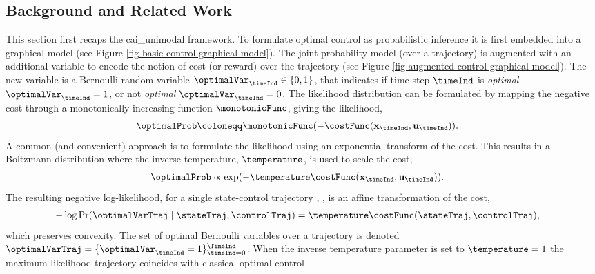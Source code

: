 \documentclass{mimosis-class/mimosis}
\numberwithin{equation}{chapter}
\newcommand{\state}{\ensuremath{\mathbf{x}}}
\newcommand{\control}{\ensuremath{\mathbf{u}}}
\begin{document}
{\subsection{Background and Related Work \label{sec-inference-background}}
\label{sec:org7e35d9c}
This section first recaps the \acrfull{cai_unimodal} framework.
To formulate optimal control as probabilistic inference
it is first embedded into a graphical model (see Figure \ref{fig-basic-control-graphical-model}).
The joint probability model (over a trajectory) is augmented with an
additional variable to encode the notion of cost (or reward)
over the trajectory (see Figure \ref{fig-augmented-control-graphical-model}).
The new variable is a Bernoulli random variable \(\optimalVar_\timeInd \in \{0, 1\}\), that indicates if
time step \(\timeInd\) is \emph{optimal} \(\optimalVar_\timeInd=1\), or not \emph{optimal} \(\optimalVar_\timeInd=0\).
The likelihood distribution can be formulated by mapping the negative
cost through a monotonically increasing function \(\monotonicFunc\),
giving the likelihood,
\begin{align} \label{eq-monotonicOptimalityLikelihood}
\optimalProb &\coloneqq \monotonicFunc( -\costFunc(\state_\timeInd, \control_\timeInd)).
\end{align}
A common (and convenient) approach is to formulate
the likelihood using an exponential transform of
the cost. This results in a Boltzmann distribution where the
inverse temperature, \(\temperature\), is used to scale the cost,
\begin{align} \label{eq-exponentialOptimalityLikelihood}
\optimalProb &\propto \exp ( -\temperature\costFunc(\state_\timeInd, \control_\timeInd)).
\end{align}
The resulting negative log-likelihood,
for a single state-control trajectory \stateTraj, \controlTraj,
is an affine transformation of the cost,
\begin{align} \label{eq-negative-log-likelihood-cost}
-\log \Pr(\optimalVarTraj \mid \stateTraj, \controlTraj)
&=  \temperature\costFunc(\stateTraj, \controlTraj),
\end{align}
which preserves convexity.
The set of optimal Bernoulli variables over a trajectory is denoted
\(\optimalVarTraj = \{\optimalVar_{\timeInd}=1\}_{\timeInd=0}^{\TimeInd}\).
When the inverse temperature parameter is set to \(\temperature=1\) the maximum likelihood
trajectory coincides with classical optimal control \citep{toussaintRobot2009}.
\begin{figure}[t]
  \centering
  \begin{subfigure}{.48\textwidth}
  \centering
   \resizebox{0.93\columnwidth}{!}{
    \begin{tikzpicture}[
      pre/.style={<-,shorten <=0.4pt,>=stealth',semithick},
      post/.style={->,shorten >=0.4pt,>=stealth',semithick}
      ]
      \node[obs] (x1) {$\state_0$};
      \node[latent, right=of x1] (x2) {$\state_1$};
      \node[latent, right=of x2] (x3) {$\state_2$};
      \node[latent, right=of x3] (x4) {$\state_3$};


\end{tikzpicture}}
\end{subfigure}
\end{figure}}
\end{document}
